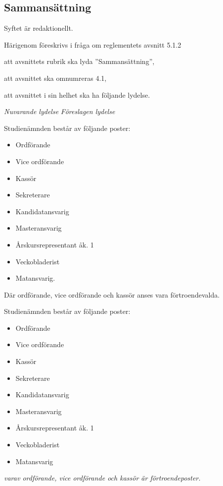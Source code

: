 \documentclass{article}
\newenvironment{lydelse}
    {\begin{paracol}{2}%
        \emph{Nuvarande lydelse}%
        \switchcolumn%
        \emph{Föreslagen lydelse}%
    \end{paracol}%
    \begin{enumerate}[label=\thesubsection.\arabic*]%
    \begin{paracol}{2}%
    }{\end{paracol}\end{enumerate}}
\begin{document}
\subsection{Sammansättning}
Syftet är redaktionellt.

Härigenom föreskrivs i fråga om reglementets avsnitt 5.1.2

\begin{dels}
    \item att avsnittets rubrik ska lyda ''Sammansättning'',
    \item att avsnittet ska omnumreras 4.1,
    \item att avsnittet i sin helhet ska ha följande lydelse.
\end{dels}

\begin{lydelse}

	\item[5.1.2.1] Studienämnden består av följande poster:
	\begin{itemize}
		\item Ordförande
		\item Vice ordförande
		\item Kassör
		\item Sekreterare
		\item Kandidatansvarig
		\item Masteransvarig
		\item Årskursrepresentant åk. 1
		\item Veckobladerist
		\item Matansvarig. 
	\end{itemize}
    Där ordförande, vice ordförande och kassör anses vara förtroendevalda.

    \switchcolumn
    \item Studienämnden består av följande poster:
    \begin{itemize}
        \item Ordförande
    	\item Vice ordförande
    	\item Kassör
    	\item Sekreterare
    	\item Kandidatansvarig
    	\item Masteransvarig
    	\item Årskursrepresentant åk. 1
    	\item Veckobladerist
    	\item Matansvarig %
    	\end{itemize}
   \emph{varav ordförande, vice ordförande och kassör är förtroendeposter.}

\end{lydelse}
\end{document}
